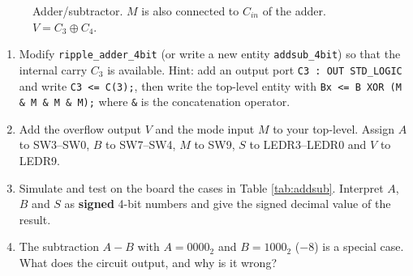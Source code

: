 \documentclass{article}
\begin{document}
\begin{figure}[H]
    \centering
    \caption{Adder/subtractor. $M$ is also connected to $C_{in}$ of the adder. $V = C_3\oplus C_4$.}
    \label{fig:addsub}
\end{figure}

\begin{enumerate}
    \item Modify \texttt{ripple\_adder\_4bit} (or write a new entity \texttt{addsub\_4bit}) so that the internal carry $C_3$ is available. Hint: add an output port \texttt{C3 : OUT STD\_LOGIC} and write \texttt{C3 <= C(3);}, then write the top-level entity with \texttt{Bx <= B XOR (M \& M \& M \& M);} where \texttt{\&} is the concatenation operator.
    \item Add the overflow output $V$ and the mode input $M$ to your top-level. Assign $A$ to SW3--SW0, $B$ to SW7--SW4, $M$ to SW9, $S$ to LEDR3--LEDR0 and $V$ to LEDR9.
    \item Simulate and test on the board the cases in Table \ref{tab:addsub}. Interpret $A$, $B$ and $S$ as \textbf{signed} 4-bit numbers and give the signed decimal value of the result.
    \item The subtraction $A-B$ with $A = 0000_2$ and $B = 1000_2$ ($-8$) is a special case. What does the circuit output, and why is it wrong?
\end{enumerate}
\end{document}
